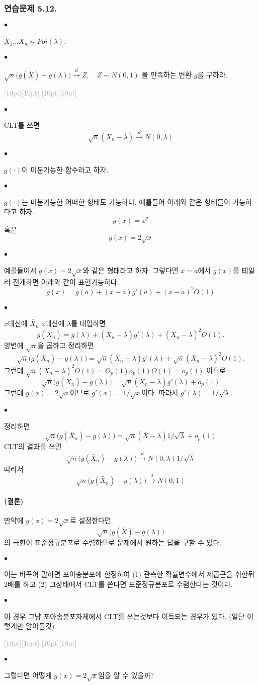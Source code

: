 \documentclass[12pt,oneside,english]{book}
\newcommand{\rdash}{\noindent \textcolor{darkgray}{ \raisebox{-1.9pt}[10pt][10pt]{\leafright} \hrulefill \raisebox{-1.9pt}[10pt][10pt]{\leafright \decofourleft \decothreeleft  \aldineright \decotwo \floweroneleft \decoone}}}
\def\ck{\paragraph{\Large$\bullet$}\Large}
\def\thus{\paragraph{\Large(결론)}\Large}
\begin{document}
\subsubsection{연습문제 5.12.}
\ck $X_1\dots X_n \sim Poi(\lambda)$. 
\ck $\sqrt{n}\big(g(\bar{X})-g(\lambda)\big) \overset{d}{\to}Z, \quad Z \sim N(0,1)$ 을 만족하는 변환 $g$를 구하라. 

\rdash

\ck CLT를 쓰면 
\[
\sqrt{n}(\bar{X}_n-\lambda) \overset{d}{\to}N(0,\lambda)
\]

\ck $g(\cdot)$이 미분가능한 함수라고 하자. 

\ck $g(\cdot)$는 미분가능한 어떠한 형태도 가능하다. 예를들어 아래와 같은 형태들이 가능하다고 하자. 
\[
g(x)=x^2
\]
혹은
\[
g(x)=2\sqrt{x}
\]

\ck 예를들어서 $g(x)=2\sqrt{x}$와 같은 형태라고 하자. 그렇다면 $x=a$에서 $g(x)$를 테일러 전개하면 아래와 같이 표현가능하다. 
\[
g(x)=g(a)+(x-a)g'(a)+(x-a)^2O(1)
\]

\ck $x$대신에 $\bar{X}_n$ $a$대신에 $\lambda$를 대입하면 
\[
g(\bar{X}_n) = g(\lambda)+(\bar{X}_n-\lambda)g'(\lambda)+(\bar{X}_n-\lambda)^2O(1).
\]
양변에 $\sqrt{n}$을 곱하고 정리하면 
\[
\sqrt{n}\big(g(\bar{X}_n) - g(\lambda)\big) =\sqrt{n}(\bar{X}_n-\lambda)g'(\lambda)+\sqrt{n}(\bar{X}_n-\lambda)^2O(1).
\]
그런데 $\sqrt{n}(\bar{X}_n-\lambda)^2O(1)=O_p(1)o_p(1)O(1)=o_p(1)$ 이므로 
\[
\sqrt{n}\big(g(\bar{X}_n) - g(\lambda)\big) =\sqrt{n}(\bar{X}_n-\lambda)g'(\lambda)+o_p(1)
\]
그런데 $g(x)=2\sqrt{x}$이므로 $g'(x)=1/\sqrt{x}$이다. 따라서 $g'(\lambda)=1/\sqrt{\lambda}$. 

\ck 정리하면 
\[
\sqrt{n}\big(g(\bar{X}_n) - g(\lambda)\big) = \sqrt{n}(\bar{X}-\lambda)1/\sqrt{\lambda}+o_p(1)
\]
CLT의 결과를 쓰면 
\[
\sqrt{n}\big(g(\bar{X}_n) - g(\lambda)\big) \overset{d}{\to} N(0,\lambda)1/\sqrt{\lambda}
\]
따라서 
\[
\sqrt{n}\big(g(\bar{X}_n) - g(\lambda)\big) \overset{d}{\to} N(0,1)
\]

\thus 만약에 $g(x)=2\sqrt{x}$로 설정한다면 
\[
\sqrt{n}\big(g(\bar{X}) - g(\lambda)\big)
\]
의 극한이 표준정규분포로 수렴하므로 문제에서 원하는 답을 구할 수 있다.

\ck 이는 바꾸어 말하면 포아송분포에 한정하여 (1) 관측한 확률변수에서 제곱근을 취한뒤 2배를 하고 (2) 그상태에서 CLT를 쓴다면 표준정규분포로 수렴한다는 것이다. 

\ck 이 경우 그냥 포아송분포자체에서 CLT를 쓰는것보다 이득되는 경우가 있다. (일단 이렇게만 알아둘것)

\rdash 

\ck 그렇다면 어떻게 $g(x)=2\sqrt{x}$임을 알 수 있을까? 
\end{document}
